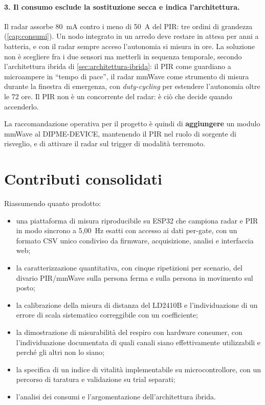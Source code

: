 \paragraph{3. Il consumo esclude la sostituzione secca e indica l'architettura.} Il
radar assorbe 80~mA contro i meno di 50~\textmu A del PIR: tre ordini di grandezza
(\cref{cap:consumi}). Un nodo integrato in un arredo deve restare in attesa per anni
a batteria, e con il radar sempre acceso l'autonomia si misura in ore. La soluzione
non è scegliere fra i due sensori ma metterli in sequenza temporale, secondo
l'architettura ibrida di \cref{sec:architettura-ibrida}: il PIR come guardiano a
microampere in ``tempo di pace'', il radar mmWave come strumento di misura durante la
finestra di emergenza, con \emph{duty-cycling} per estendere l'autonomia oltre le 72
ore. Il PIR non è un concorrente del radar: è ciò che decide quando accenderlo.

\medskip
\noindent
La raccomandazione operativa per il progetto è quindi di \textbf{aggiungere} un
modulo mmWave al DIPME-DEVICE, mantenendo il PIR nel ruolo di sorgente di risveglio,
e di attivare il radar sul trigger di modalità terremoto.

\section{Contributi consolidati}

Riassumendo quanto prodotto:

\begin{itemize}[leftmargin=1.4em,itemsep=3pt]
  \item una piattaforma di misura riproducibile su ESP32 che campiona radar e PIR in
        modo sincrono a 5,00~Hz esatti con accesso ai dati per-gate, con un formato
        CSV unico condiviso da firmware, acquisizione, analisi e interfaccia web;
  \item la caratterizzazione quantitativa, con cinque ripetizioni per scenario, del
        divario PIR/mmWave sulla persona ferma e sulla persona in movimento sul
        posto;
  \item la calibrazione della misura di distanza del LD2410B e l'individuazione di un
        errore di scala sistematico correggibile con un coefficiente;
  \item la dimostrazione di misurabilità del respiro con hardware consumer, con
        l'individuazione documentata di quali canali siano effettivamente
        utilizzabili e perché gli altri non lo siano;
  \item la specifica di un indice di vitalità implementabile su microcontrollore, con
        un percorso di taratura e validazione su trial separati;
  \item l'analisi dei consumi e l'argomentazione dell'architettura ibrida.
\end{itemize}

